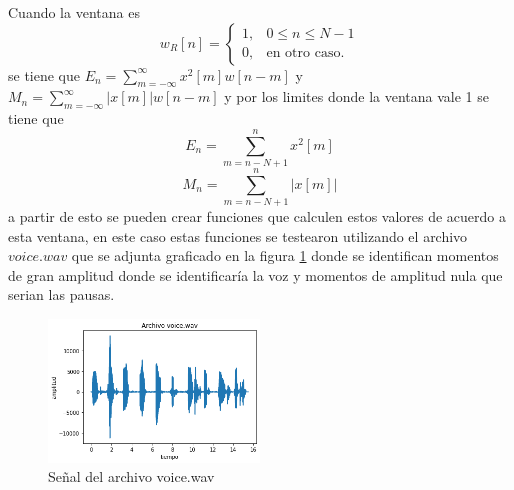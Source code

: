 \documentclass[a4paper]{article}
\begin{document}
\newline
Cuando la ventana es
$$
w_R[n]=
			\begin{cases}
				1, & 0 \leq n \leq N-1 \\
				0, & \text{en otro caso}.
			\end{cases}
$$
se tiene que $E_n  =  \sum_{m=-\infty}^{\infty}x^2[m]w[n-m]$ y
$ M_n  = \sum_{m=-\infty}^{\infty}|x[m]|w[n-m]$ y por los limites donde la ventana vale 1 se tiene que 
$$
E_n  =  \sum_{m=n-N+1}^{n}x^2[m]
$$
$$
M_n  =  \sum_{m=n-N+1}^{n}|x[m]|
$$
a partir de esto se pueden crear funciones que calculen estos valores de acuerdo a esta ventana, en este caso estas funciones se testearon utilizando el archivo $voice.wav$ que se adjunta graficado en la figura \ref{voicewav} donde se identifican momentos de gran amplitud donde se identificaría la voz y momentos de amplitud nula que serian las pausas.
\begin{figure}[h]
\centering
\includegraphics[width=0.5\textwidth]{voicewav.png}
\caption{Señal del archivo voice.wav}
\label{voicewav}
\end{figure}
\end{document}
